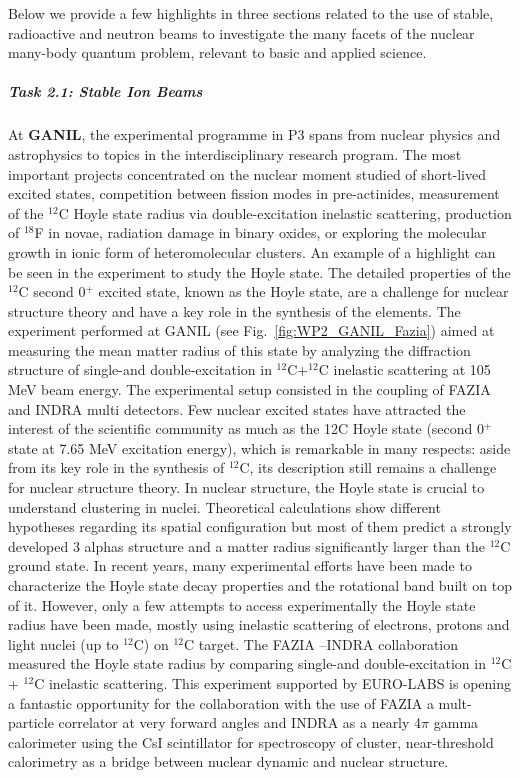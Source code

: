 Below we provide a few highlights in three sections related to the use of stable, radioactive and neutron beams to investigate the many facets of the nuclear many-body quantum problem, relevant to basic and applied science.

\subparagraph{Task 2.1: Stable Ion Beams} \mbox{}


At \textbf{GANIL}, the experimental programme in P3 spans from nuclear physics and astrophysics to topics in the interdisciplinary research program. The most important projects concentrated on the nuclear moment studied of short-lived excited states, competition between fission modes in pre-actinides, measurement of the $^{12}$C Hoyle state radius via double-excitation inelastic scattering, production of $^{18}$F in novae, radiation damage in binary oxides, or exploring the molecular growth in ionic form of heteromolecular clusters.
An example of a highlight can be seen in the experiment to study the Hoyle state.
The detailed properties of the $^{12}$C second 0$^{+}$ excited state, known as the Hoyle state, are a challenge for nuclear structure theory and have a key role in the synthesis of the elements. The experiment performed at GANIL (see Fig.~\ref{fig:WP2_GANIL_Fazia}) aimed at measuring the mean matter radius of this state by analyzing the diffraction structure of single-and double-excitation in $^{12}$C+$^{12}$C inelastic scattering at 105 MeV beam energy. 
The experimental setup consisted in the coupling of FAZIA and INDRA multi detectors. Few nuclear excited states have attracted the interest of the scientific community as much as the 12C Hoyle state (second 0$^{+}$ state at 7.65 MeV excitation energy), which is remarkable in many respects: aside from its key role in the synthesis of $^{12}$C, its description still remains a challenge for nuclear structure theory. In nuclear structure, the Hoyle state is crucial to understand clustering in nuclei. Theoretical calculations show different hypotheses regarding its spatial configuration but most of them predict a strongly developed 3 alphas structure and a matter radius significantly larger than the $^{12}$C ground state. In recent years, many experimental efforts have been made to characterize the Hoyle state decay properties and the rotational band built on top of it. However, only a few attempts to access experimentally the Hoyle state radius have been made, mostly using inelastic scattering of electrons, protons and light nuclei (up to $^{12}$C) on $^{12}$C target. The FAZIA –INDRA collaboration measured the Hoyle state radius by comparing single-and double-excitation in $^{12}$C + $^{12}$C inelastic scattering. This experiment supported by EURO-LABS is opening a fantastic opportunity for the collaboration with the use of FAZIA a mult-particle correlator at very forward angles and INDRA as a nearly 4$\pi$ gamma calorimeter using the CsI scintillator for spectroscopy of cluster, near-threshold calorimetry as a bridge between nuclear dynamic and nuclear structure. 

